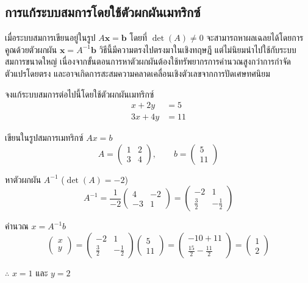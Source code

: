 \subsection{การแก้ระบบสมการโดยใช้ตัวผกผันเมทริกซ์}
\label{ssec:solve-by-inverse}
เมื่อระบบสมการเขียนอยู่ในรูป $A\mathbf{x} = \mathbf{b}$ โดยที่ $\det(A) \neq 0$ จะสามารถหาผลเฉลยได้โดยการคูณด้วยตัวผกผัน $\mathbf{x} = A^{-1}\mathbf{b}$ วิธีนี้มีความตรงไปตรงมาในเชิงทฤษฎี แต่ไม่นิยมนำไปใช้กับระบบสมการขนาดใหญ่ เนื่องจากขั้นตอนการหาตัวผกผันต้องใช้ทรัพยากรการคำนวณสูงกว่าการกำจัดตัวแปรโดยตรง และอาจเกิดการสะสมความคลาดเคลื่อนเชิงตัวเลขจากการปัดเศษทศนิยม~\parencite{strang2023linear}

\begin{ex}
\label{ex:solve-by-inverse}
จงแก้ระบบสมการต่อไปนี้โดยใช้ตัวผกผันเมทริกซ์
\[
\begin{aligned}
x + 2y &= 5 \\
3x + 4y &= 11
\end{aligned}
\]
\end{ex}
\begin{solution}
เขียนในรูปสมการเมทริกซ์ $Ax = b$ \[ A = \begin{pmatrix} 1 & 2 \\ 3 & 4 \end{pmatrix}, \qquad b = \begin{pmatrix} 5 \\ 11 \end{pmatrix} \]

หาตัวผกผัน $A^{-1}$ ($\det(A) = -2$) \[ A^{-1} = \frac{1}{-2}\begin{pmatrix} 4 & -2 \\ -3 & 1 \end{pmatrix} = \begin{pmatrix} -2 & 1 \\ \tfrac{3}{2} & -\tfrac{1}{2} \end{pmatrix} \]

คำนวณ $x = A^{-1}b$ \[ \begin{pmatrix} x \\ y \end{pmatrix} = \begin{pmatrix} -2 & 1 \\ \tfrac{3}{2} & -\tfrac{1}{2} \end{pmatrix}\begin{pmatrix} 5 \\ 11 \end{pmatrix} = \begin{pmatrix} -10+11 \\ \tfrac{15}{2}-\tfrac{11}{2} \end{pmatrix} = \begin{pmatrix} 1 \\ 2 \end{pmatrix} \]

$\therefore$ $x = 1$ และ $y = 2$ \solhere
\end{solution}

